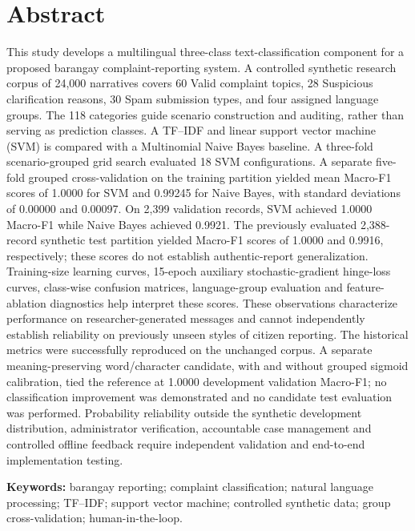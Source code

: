 \documentclass[12pt,oneside,openany]{book}
\begin{document}
\chapter*{Abstract}
This study develops a multilingual three-class text-classification component for a proposed barangay complaint-reporting system. A controlled synthetic research corpus of 24,000 narratives covers 60 Valid complaint topics, 28 Suspicious clarification reasons, 30 Spam submission types, and four assigned language groups. The 118 categories guide scenario construction and auditing, rather than serving as prediction classes. A TF--IDF and linear support vector machine (SVM) is compared with a Multinomial Naive Bayes baseline. A three-fold scenario-grouped grid search evaluated 18 SVM configurations. A separate five-fold grouped cross-validation on the training partition yielded mean Macro-F1 scores of 1.0000 for SVM and 0.99245 for Naive Bayes, with standard deviations of 0.00000 and 0.00097. On 2,399 validation records, SVM achieved 1.0000 Macro-F1 while Naive Bayes achieved 0.9921. The previously evaluated 2,388-record synthetic test partition yielded Macro-F1 scores of 1.0000 and 0.9916, respectively; these scores do not establish authentic-report generalization. Training-size learning curves, 15-epoch auxiliary stochastic-gradient hinge-loss curves, class-wise confusion matrices, language-group evaluation and feature-ablation diagnostics help interpret these scores. These observations characterize performance on researcher-generated messages and cannot independently establish reliability on previously unseen styles of citizen reporting. The historical metrics were successfully reproduced on the unchanged corpus. A separate meaning-preserving word/character candidate, with and without grouped sigmoid calibration, tied the reference at 1.0000 development validation Macro-F1; no classification improvement was demonstrated and no candidate test evaluation was performed. Probability reliability outside the synthetic development distribution, administrator verification, accountable case management and controlled offline feedback require independent validation and end-to-end implementation testing. 
\par\medskip\textbf{Keywords:} barangay reporting; complaint classification; natural language processing; TF--IDF; support vector machine; controlled synthetic data; group cross-validation; human-in-the-loop.
\tableofcontents
\listoffigures
\listoftables
\mainmatter








\backmatter
\renewcommand{\bibname}{References}
\cleardoublepage{}

\end{document}
